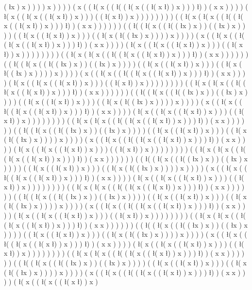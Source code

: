 ( \l x ) x ) ) ) ) x ) ) ) ) ( x ( ( \l ( x ( ( \l ( ( \l ( x ( ( \l ( x \l ) ) x ) ) ) \l ) ) ( x x ) ) ) ) ( \l ( x ( ( \l ( x ( ( \l ( x \l ) ) x ) ) ) ( ( \l ( x \l ) ) x ) ) ) ) ) ) ) ) ( ( \l ( x ( \l ( x ( ( \l ( ( \l ( x ( ( \l ( x \l ) ) x ) ) ) \l ) ) ( x x ) ) ) ) ) ) ( ( \l ( ( \l ( x ( ( \l ( ( \l x ) x ) ) ( ( \l x ) x ) ) ) ) ( ( \l ( x ( ( \l ( x \l ) ) x ) ) ) ( ( \l ( x ( \l ( ( \l x ) x ) ) ) ) x ) ) ) ) ( x ( ( \l ( x ( ( \l ( ( \l ( x ( ( \l ( x \l ) ) x ) ) ) \l ) ) ( x x ) ) ) ) ( \l ( x ( ( \l ( x ( ( \l ( x \l ) ) x ) ) ) ( ( \l ( x \l ) ) x ) ) ) ) ) ) ) ) ( ( \l ( x ( \l ( x ( ( \l ( ( \l ( x ( ( \l ( x \l ) ) x ) ) ) \l ) ) ( x x ) ) ) ) ) ) ( ( \l ( ( \l ( x ( ( \l ( ( \l x ) x ) ) ( ( \l x ) x ) ) ) ) ( ( \l ( x ( ( \l ( x \l ) ) x ) ) ) ( ( \l ( x ( \l ( ( \l x ) x ) ) ) ) x ) ) ) ) ( x ( ( \l ( x ( ( \l ( ( \l ( x ( ( \l ( x \l ) ) x ) ) ) \l ) ) ( x x ) ) ) ) ( \l ( x ( ( \l ( x ( ( \l ( x \l ) ) x ) ) ) ( ( \l ( x \l ) ) x ) ) ) ) ) ) ) ) ( ( \l ( x ( \l ( x ( ( \l ( ( \l ( x ( ( \l ( x \l ) ) x ) ) ) \l ) ) ( x x ) ) ) ) ) ) ( ( \l ( ( \l ( x ( ( \l ( ( \l x ) x ) ) ( ( \l x ) x ) ) ) ) ( ( \l ( x ( ( \l ( x \l ) ) x ) ) ) ( ( \l ( x ( \l ( ( \l x ) x ) ) ) ) x ) ) ) ) ( x ( ( \l ( x ( ( \l ( ( \l ( x ( ( \l ( x \l ) ) x ) ) ) \l ) ) ( x x ) ) ) ) ( \l ( x ( ( \l ( x ( ( \l ( x \l ) ) x ) ) ) ( ( \l ( x \l ) ) x ) ) ) ) ) ) ) ) ( ( \l ( x ( \l ( x ( ( \l ( ( \l ( x ( ( \l ( x \l ) ) x ) ) ) \l ) ) ( x x ) ) ) ) ) ) ( ( \l ( ( \l ( x ( ( \l ( ( \l x ) x ) ) ( ( \l x ) x ) ) ) ) ( ( \l ( x ( ( \l ( x \l ) ) x ) ) ) ( ( \l ( x ( \l ( ( \l x ) x ) ) ) ) x ) ) ) ) ( x ( ( \l ( x ( ( \l ( ( \l ( x ( ( \l ( x \l ) ) x ) ) ) \l ) ) ( x x ) ) ) ) ( \l ( x ( ( \l ( x ( ( \l ( x \l ) ) x ) ) ) ( ( \l ( x \l ) ) x ) ) ) ) ) ) ) ) ( ( \l ( x ( \l ( x ( ( \l ( ( \l ( x ( ( \l ( x \l ) ) x ) ) ) \l ) ) ( x x ) ) ) ) ) ) ( ( \l ( ( \l ( x ( ( \l ( ( \l x ) x ) ) ( ( \l x ) x ) ) ) ) ( ( \l ( x ( ( \l ( x \l ) ) x ) ) ) ( ( \l ( x ( \l ( ( \l x ) x ) ) ) ) x ) ) ) ) ( x ( ( \l ( x ( ( \l ( ( \l ( x ( ( \l ( x \l ) ) x ) ) ) \l ) ) ( x x ) ) ) ) ( \l ( x ( ( \l ( x ( ( \l ( x \l ) ) x ) ) ) ( ( \l ( x \l ) ) x ) ) ) ) ) ) ) ) ( ( \l ( x ( \l ( x ( ( \l ( ( \l ( x ( ( \l ( x \l ) ) x ) ) ) \l ) ) ( x x ) ) ) ) ) ) ( ( \l ( ( \l ( x ( ( \l ( ( \l x ) x ) ) ( ( \l x ) x ) ) ) ) ( ( \l ( x ( ( \l ( x \l ) ) x ) ) ) ( ( \l ( x ( \l ( ( \l x ) x ) ) ) ) x ) ) ) ) ( x ( ( \l ( x ( ( \l ( ( \l ( x ( ( \l ( x \l ) ) x ) ) ) \l ) ) ( x x ) ) ) ) ( \l ( x ( ( \l ( x ( ( \l ( x \l ) ) x ) ) ) ( ( \l ( x \l ) ) x ) ) ) ) ) ) ) ) ( ( \l ( x ( \l ( x ( ( \l ( ( \l ( x ( ( \l ( x \l ) ) x ) ) ) \l ) ) ( x x ) ) ) ) ) ) ( ( \l ( ( \l ( x ( ( \l ( ( \l x ) x ) ) ( ( \l x ) x ) ) ) ) ( ( \l ( x ( ( \l ( x \l ) ) x ) ) ) ( ( \l ( x ( \l ( ( \l x ) x ) ) ) ) x ) ) ) ) ( x ( ( \l ( x ( ( \l ( ( \l ( x ( ( \l ( x \l ) ) x ) ) ) \l ) ) ( x x ) ) ) ) ( \l ( x ( ( \l ( x ( ( \l ( x \l ) ) x ) ) ) ( ( \l ( x \l ) ) x ) ) ) ) ) ) ) ) ( ( \l ( x ( \l ( x ( ( \l ( ( \l ( x ( ( \l ( x \l ) ) x ) ) ) \l ) ) ( x x ) ) ) ) ) ) ( ( \l ( ( \l ( x ( ( \l ( ( \l x ) x ) ) ( ( \l x ) x ) ) ) ) ( ( \l ( x ( ( \l ( x \l ) ) x ) ) ) ( ( \l ( x ( \l ( ( \l x ) x ) ) ) ) x ) ) ) ) ( x ( ( \l ( x ( ( \l ( ( \l ( x ( ( \l ( x \l ) ) x ) ) ) \l ) ) ( x x ) ) ) ) ( \l ( x ( ( \l ( x ( ( \l ( x \l ) ) x ) 